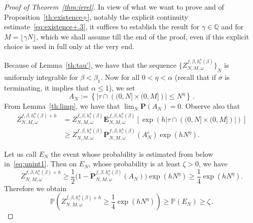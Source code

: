 \documentclass[AHL,Unicode,longabstracts]{cedram}
\newcommand{\ga}{\alpha}
\newcommand{\bP}{\ensuremath{\mathbf{P}}}
\newcommand{\bE}{\ensuremath{\mathbf{E}}}
\newcommand{\bbP}{\ensuremath{\mathbb{P}}}
\newcommand{\bbQ}{\ensuremath{\mathbb{Q}}}
\begin{document}
\begin{proof}[Proof of Theorem~\ref{thm:irrel}]
In view of what we want to prove and of Proposition~\ref{th:existence+}, notably the explicit continuity estimate~\eqref{eq:existence+.3}, it suffices to establish the result for $\gamma\in \bbQ$ and for $M=\lfloor \gamma N \rfloor$, which we shall assume till the end of the proof, even if this explicit choice is used in full only at the very end.

Because of Lemma~\ref{th:tau'}, we have that the sequence ${ \lbrace Z_{N,M,\omega}^{f,\beta,h_c^a(\beta)} \rbrace}_{N}$ is uniformly integrable for $\beta<\beta_1$. Now for all $0<\eta < \ga$ (recall that if $\sigma$ is terminating, it implies that $\ga\leq 1$), we set
\begin{equation}\label{eq:AN}
A_{N} := \left\lbrace \vert \tau \cap \left((0,N] \times (0,M] \right) \rvert \le N^{\eta} \right\rbrace\,.
\end{equation}
From Lemma~\ref{th:limp}, we have that $\lim_N \bP(A_{N}) =0$. Observe also that
\begin{equation}\label{eq:binfz}
\begin{split}
Z_{N,M,\omega}^{f,\beta,h_c^a(\beta)+h} & = Z_{N,M,\omega}^{f,\beta,h_c^a(\beta)} \bE_{N,M,\omega}^{f,\beta,h_c^a(\beta)} \left[\exp \left(h \lvert \tau \cap \left((0,N]\times(0,M] \right) \rvert \right)\right] \\
& \ge Z_{N,M,\omega}^{f,\beta,h_c^a(\beta)} \bP_{N,M,\omega}^{f,\beta,h_c^a(\beta)} \left({A}^{c}_{N} \right) \exp \left(h N^{\eta} \right).
\end{split}
\end{equation}


Let us call $E_N$ the event whose probability is estimated from below in~\eqref{eq:unint1}. Then on $E_N$, whose probability is at least $\zeta >0$, we have
\begin{equation}\label{eq:zfb}
Z_{N,M,\omega}^{f,\beta,h_c^a(\beta)+h}
\ge \frac{1}{2} \Big(1- \bP_{N,M,\omega}^{f,\beta,h_c^a(\beta)} \left(A_{N} \right) \Big) \exp \left(h N^\eta\right)
\ge \frac1 4 \exp \left(h N^{\eta}\right).
\end{equation}
Therefore we obtain
\begin{equation}\label{eq:zfpb}
\bbP \left(Z_{N,M,\omega}^{f,\beta,h_c^a(\beta)+h} \ge \frac{1}{4} \exp \left(h N^{\eta}\right) \right) \ge \bbP\left(E_N\right) \ge \zeta\,.
\end{equation}


\end{proof}
\end{document}
